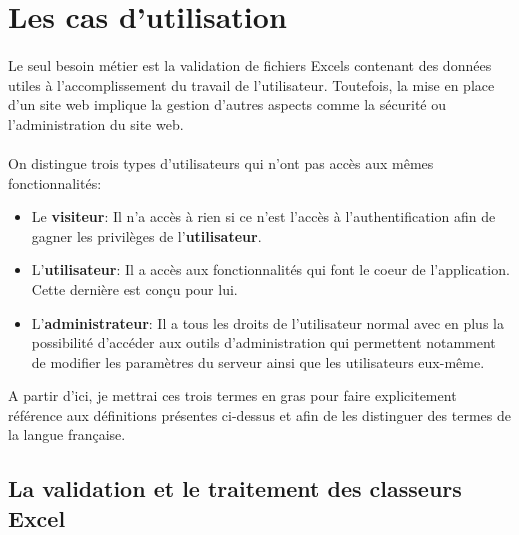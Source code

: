 \section{Les cas d'utilisation}
\label{sec:use-cases}

\paragraph{}
Le seul besoin métier est la validation de fichiers Excels contenant des données utiles à l'accomplissement du travail de l'utilisateur. Toutefois, la mise en place d'un site web implique la gestion d'autres aspects comme la sécurité ou l'administration du site web.

\paragraph{}
On distingue trois types d'utilisateurs qui n'ont pas accès aux mêmes fonctionnalités:
\begin{itemize}
    \item Le \textbf{visiteur}: Il n'a accès à rien si ce n'est l'accès à l'authentification afin de gagner les privilèges de l'\textbf{utilisateur}.
    \item L'\textbf{utilisateur}: Il a accès aux fonctionnalités qui font le coeur de l'application. Cette dernière est conçu pour lui.
    \item L'\textbf{administrateur}: Il a tous les droits de l'utilisateur normal avec en plus la possibilité d'accéder aux outils d'administration qui permettent notamment de modifier les paramètres du serveur ainsi que les utilisateurs eux-même.
\end{itemize}

A partir d'ici, je mettrai ces trois termes en gras pour faire explicitement référence aux définitions présentes ci-dessus et afin de les distinguer des termes de la langue française.



\subsection{La validation et le traitement des classeurs Excel}
\label{subsec:spreadsheet-use-case}
